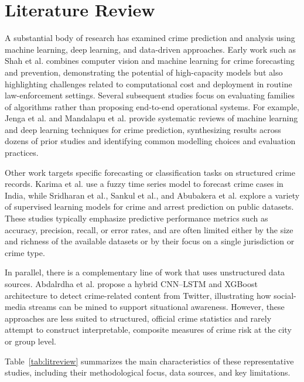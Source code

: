 \documentclass[conference]{IEEEtran}
\begin{document}
\section{Literature Review}
A substantial body of research has examined crime prediction and analysis using machine learning, deep learning, and data-driven approaches. Early work such as Shah et al.\cite{b1} combines computer vision and machine learning for crime forecasting and prevention, demonstrating the potential of high-capacity models but also highlighting challenges related to computational cost and deployment in routine law-enforcement settings. Several subsequent studies focus on evaluating families of algorithms rather than proposing end-to-end operational systems. For example, Jenga et al.\cite{b2} and Mandalapu et al.\cite{b4} provide systematic reviews of machine learning and deep learning techniques for crime prediction, synthesizing results across dozens of prior studies and identifying common modelling choices and evaluation practices.

Other work targets specific forecasting or classification tasks on structured crime records. Karima et al.\cite{b3} use a fuzzy time series model to forecast crime cases in India, while Sridharan et al.\cite{b5}, Sankul et al.\cite{b7}, and Abubakera et al.\cite{b8} explore a variety of supervised learning models for crime and arrest prediction on public datasets. These studies typically emphasize predictive performance metrics such as accuracy, precision, recall, or error rates, and are often limited either by the size and richness of the available datasets or by their focus on a single jurisdiction or crime type.

In parallel, there is a complementary line of work that uses unstructured data sources. Abdalrdha et al.\cite{b6} propose a hybrid CNN--LSTM and XGBoost architecture to detect crime-related content from Twitter, illustrating how social-media streams can be mined to support situational awareness. However, these approaches are less suited to structured, official crime statistics and rarely attempt to construct interpretable, composite measures of crime risk at the city or group level.

Table~\ref{tab:litreview} summarizes the main characteristics of these representative studies, including their methodological focus, data sources, and key limitations.
\end{document}
